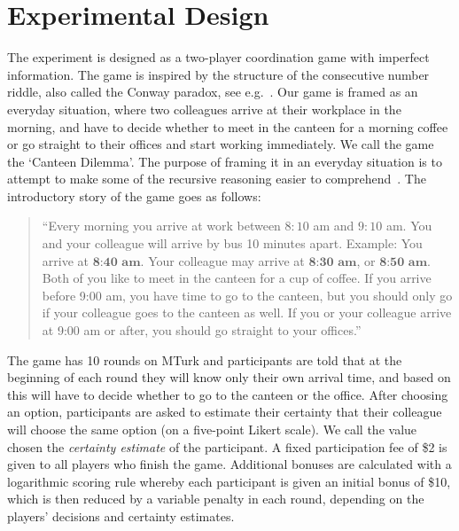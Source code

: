\documentclass[twocolumn,a4paper,superscriptaddress,nofootinbib]{revtex4}
\begin{document}
\section{Experimental Design}
The experiment is designed as a two-player coordination game with imperfect information. The game is inspired by the structure of the consecutive number riddle, also called the Conway paradox, see e.g.\ \citet{van1980conway,van2015one}. Our game is framed as an everyday situation, where two colleagues arrive at their workplace in the morning, and have to decide whether to meet in the canteen for a morning coffee or go straight to their offices and start working immediately. We call the game the `Canteen Dilemma'. The purpose of framing it in an everyday situation is to attempt to make some of the recursive reasoning easier to comprehend~\citep{meijering2010facilitative, wason1971natural}. The introductory story of the game goes as follows:
\begin{quote}
\indent
``Every morning you arrive at work between $8{:}10$ am and $9{:}10$ am. You and your colleague will arrive by bus 10 minutes apart. Example: You arrive at $\textbf{8:40 am}$. Your colleague may arrive at $\textbf{8:30  am}$, or $\textbf{8:50 am}$. Both of you like to meet in the canteen for a cup of coffee. If you arrive before 9:00 am, you have time to go to the canteen, but you should only go if your colleague goes to the canteen as well. If you or your colleague arrive at 9:00 am or after, you should go straight to your offices.''
\end{quote}
The game has 10 rounds on MTurk and participants are told that at the beginning of each round they will know only their own arrival time, and based on this will have to decide whether to go to the canteen or the office. After choosing an option, participants are asked to estimate their certainty that their colleague will choose the same option (on a five-point Likert scale). We call the value chosen the \emph{certainty estimate} of the participant. A fixed participation fee of \$2 is given to all players who finish the game. Additional bonuses are calculated with a logarithmic scoring rule whereby each participant is given an initial bonus of \$10, which is then reduced by a variable penalty in  each round, depending on the players' decisions and certainty estimates.
\end{document}
